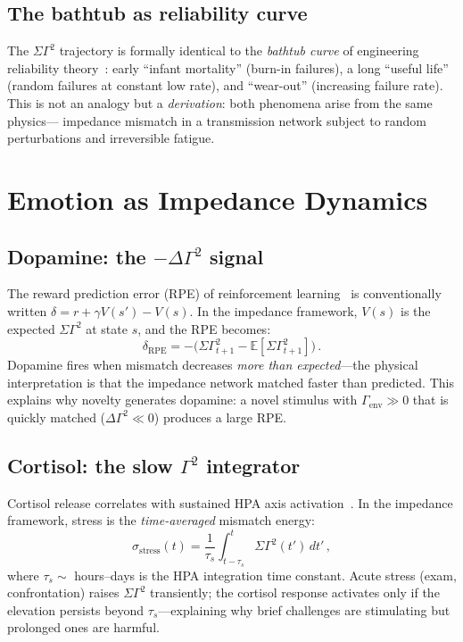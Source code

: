 ﻿\documentclass[aps,pre,twocolumn,superscriptaddress,floatfix]{revtex4-2}
\begin{document}
\subsection{The bathtub as reliability curve}

The $\Sigma\Gamma^2$ trajectory is formally identical
to the \emph{bathtub curve} of engineering reliability
theory~\cite{Klutke2003}:
early ``infant mortality'' (burn-in failures),
a long ``useful life'' (random failures at constant
low rate), and ``wear-out'' (increasing failure rate).
This is not an analogy but a \emph{derivation}:
both phenomena arise from the same physics---
impedance mismatch in a transmission network subject
to random perturbations and irreversible fatigue.


\section{Emotion as Impedance Dynamics}
\label{sec:emotion-detail}

\subsection{Dopamine: the $-\Delta\Gamma^2$ signal}

The reward prediction error (RPE) of reinforcement
learning~\cite{Schultz1997} is conventionally written
$\delta = r + \gamma V(s') - V(s)$.
In the impedance framework, $V(s)$ is the expected
$\Sigma\Gamma^2$ at state $s$, and the RPE becomes:
\begin{equation}
  \delta_{\mathrm{RPE}} = -\bigl(\Sigma\Gamma^2_{t+1}
    - \mathbb{E}[\Sigma\Gamma^2_{t+1}]\bigr)\,.
  \label{eq:rpe}
\end{equation}
Dopamine fires when mismatch decreases \emph{more than
expected}---the physical interpretation is that
the impedance network matched faster than predicted.
This explains why novelty generates dopamine:
a novel stimulus with $\Gamma_{\mathrm{env}} \gg 0$
that is quickly matched ($\Delta\Gamma^2 \ll 0$)
produces a large RPE.

\subsection{Cortisol: the slow $\Gamma^2$ integrator}

Cortisol release correlates with sustained HPA axis
activation~\cite{McEwen1998}.
In the impedance framework, stress is the
\emph{time-averaged} mismatch energy:
\begin{equation}
  \sigma_{\mathrm{stress}}(t) =
    \frac{1}{\tau_s} \int_{t-\tau_s}^{t}
    \Sigma\Gamma^2(t')\,dt'\,,
  \label{eq:cortisol}
\end{equation}
where $\tau_s \sim$ hours--days is the HPA integration
time constant.
Acute stress (exam, confrontation) raises
$\Sigma\Gamma^2$ transiently; the cortisol response
activates only if the elevation persists beyond
$\tau_s$---explaining why brief challenges are
stimulating but prolonged ones are harmful.
\end{document}

